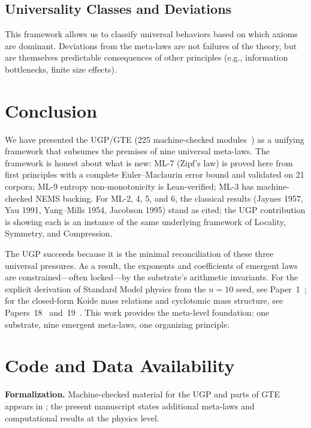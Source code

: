 \documentclass[11pt]{article}
\begin{document}
\subsection{Universality Classes and Deviations}
This framework allows us to classify universal behaviors based on which axioms are dominant. Deviations from the meta-laws are not failures of the theory, but are themselves predictable consequences of other principles (e.g., information bottlenecks, finite size effects).

\section{Conclusion}
We have presented the UGP/GTE (225 machine-checked modules~\cite{SpivackUGPFormalization,ugp-lean}) as a unifying framework that subsumes the premises of nine universal meta-laws. The framework is honest about what is new: ML-7 (Zipf's law) is proved here from first principles with a complete Euler--Maclaurin error bound and validated on 21 corpora; ML-9 entropy non-monotonicity is Lean-verified; ML-3 has machine-checked NEMS backing. For ML-2, 4, 5, and 6, the classical results (Jaynes 1957, Yau 1991, Yang--Mills 1954, Jacobson 1995) stand as cited; the UGP contribution is showing each is an instance of the same underlying framework of Locality, Symmetry, and Compression.

The UGP succeeds because it is the minimal reconciliation of these three universal pressures. As a result, the exponents and coefficients of emergent laws are constrained---often locked---by the substrate's arithmetic invariants. For the explicit derivation of Standard Model physics from the $n=10$ seed, see Paper~1~\cite{Spivack2025_ParticlePhysics}; for the closed-form Koide mass relations and cyclotomic mass structure, see Papers~18~\cite{Spivack2026_Koide} and~19~\cite{Spivack2026_CyclotomicMass}. This work provides the meta-level foundation: one substrate, nine emergent meta-laws, one organizing principle.

\section*{Code and Data Availability}

\noindent\textbf{Formalization.} Machine-checked material for the UGP and parts of GTE appears in \cite{SpivackUGPFormalization,ugp-lean}; the present manuscript states additional meta-laws and computational results at the physics level.
\end{document}
